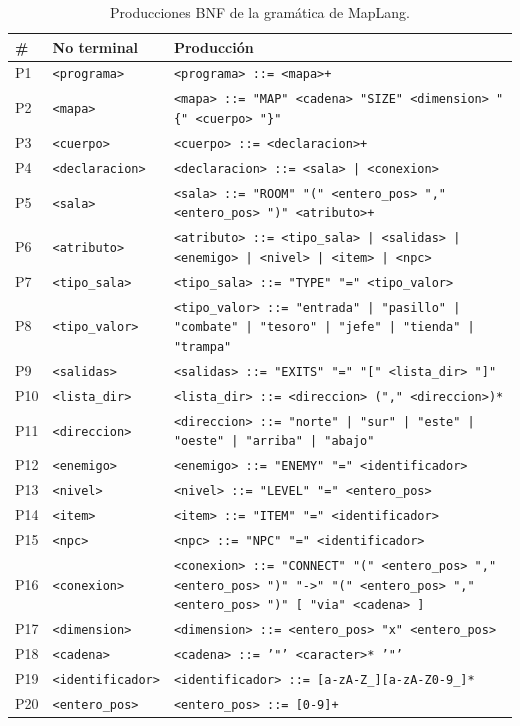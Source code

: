 \documentclass[10pt,twocolumn]{article}
\begin{document}
\begin{table}[t]
\centering
\caption{Producciones BNF de la gramática de MapLang.}
\label{tab:produc}
\small
\begin{tabularx}{\textwidth}{l l X}
\toprule
\textbf{\#} & \textbf{No terminal} & \textbf{Producción} \\
\midrule
P1  & \texttt{<programa>}      & \texttt{<programa> ::= <mapa>+} \\
P2  & \texttt{<mapa>}           & \texttt{<mapa> ::= "MAP" <cadena> "SIZE" <dimension> "\{" <cuerpo> "\}"} \\
P3  & \texttt{<cuerpo>}          & \texttt{<cuerpo> ::= <declaracion>+} \\
P4  & \texttt{<declaracion>}      & \texttt{<declaracion> ::= <sala> | <conexion>} \\
P5  & \texttt{<sala>}              & \texttt{<sala> ::= "ROOM" "(" <entero\_pos> "," <entero\_pos> ")" <atributo>+} \\
P6  & \texttt{<atributo>}          & \texttt{<atributo> ::= <tipo\_sala> | <salidas> | <enemigo> | <nivel> | <item> | <npc>} \\
P7  & \texttt{<tipo\_sala>}         & \texttt{<tipo\_sala> ::= "TYPE" "=" <tipo\_valor>} \\
P8  & \texttt{<tipo\_valor>}        & \texttt{<tipo\_valor> ::= "entrada" | "pasillo" | "combate" | "tesoro" | "jefe" | "tienda" | "trampa"} \\
P9  & \texttt{<salidas>}            & \texttt{<salidas> ::= "EXITS" "=" "[" <lista\_dir> "]"} \\
P10 & \texttt{<lista\_dir>}          & \texttt{<lista\_dir> ::= <direccion> ("," <direccion>)*} \\
P11 & \texttt{<direccion>}            & \texttt{<direccion> ::= "norte" | "sur" | "este" | "oeste" | "arriba" | "abajo"} \\
P12 & \texttt{<enemigo>}               & \texttt{<enemigo> ::= "ENEMY" "=" <identificador>} \\
P13 & \texttt{<nivel>}                  & \texttt{<nivel> ::= "LEVEL" "=" <entero\_pos>} \\
P14 & \texttt{<item>}                    & \texttt{<item> ::= "ITEM" "=" <identificador>} \\
P15 & \texttt{<npc>}                      & \texttt{<npc> ::= "NPC" "=" <identificador>} \\
P16 & \texttt{<conexion>}                  & \texttt{<conexion> ::= "CONNECT" "(" <entero\_pos> "," <entero\_pos> ")" "->" "(" <entero\_pos> "," <entero\_pos> ")" [ "via" <cadena> ]} \\
P17 & \texttt{<dimension>}                  & \texttt{<dimension> ::= <entero\_pos> "x" <entero\_pos>} \\
P18 & \texttt{<cadena>}                      & \texttt{<cadena> ::= '"' <caracter>* '"'} \\
P19 & \texttt{<identificador>}                & \texttt{<identificador> ::= [a-zA-Z\_][a-zA-Z0-9\_]*} \\
P20 & \texttt{<entero\_pos>}                    & \texttt{<entero\_pos> ::= [0-9]+} \\
\bottomrule
\end{tabularx}
\end{table}
\end{document}
